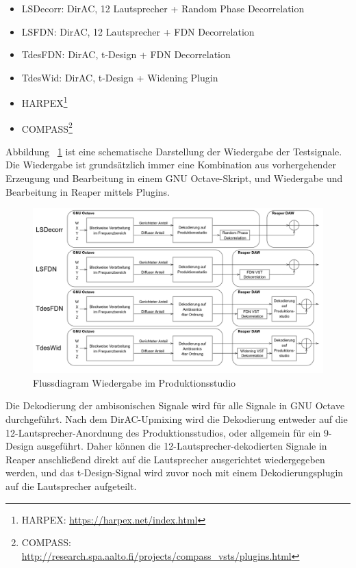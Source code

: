 \begin{itemize}
	\item LSDecorr: DirAC, 12 Lautsprecher + Random Phase Decorrelation
	\item LSFDN: DirAC, 12 Lautsprecher + FDN Decorrelation
	\item TdesFDN: DirAC, t-Design + FDN Decorrelation
	\item TdesWid: DirAC, t-Design + Widening Plugin
	\item HARPEX\footnote{HARPEX: \url{https://harpex.net/index.html}}
	\item COMPASS\footnote{COMPASS: \url{http://research.spa.aalto.fi/projects/compass_vsts/plugins.html}}
\end{itemize}




Abbildung ~\ref{fig:algos} ist eine schematische Darstellung der Wiedergabe der Testsignale. Die Wiedergabe ist grundsätzlich immer eine Kombination aus vorhergehender Erzeugung und Bearbeitung in einem GNU Octave-Skript, und Wiedergabe und Bearbeitung in Reaper mittels Plugins.

\begin{figure}[!ht]
  \centering
  \includegraphics[width=1\textwidth]{aufbau/diagram.png}
  \caption{Flussdiagram Wiedergabe im Produktionsstudio}
  	\label{fig:algos}
\end{figure}

Die Dekodierung der ambisonischen Signale wird für alle Signale in GNU Octave durchgeführt. Nach dem DirAC-Upmixing wird die Dekodierung entweder auf die 12-Lautsprecher-Anordnung des Produktionsstudios, oder allgemein für ein 9-Design ausgeführt. Daher können die 12-Lautsprecher-dekodierten Signale in Reaper anschließend direkt auf die Lautsprecher ausgerichtet wiedergegeben werden, und das t-Design-Signal wird zuvor noch mit einem Dekodierungsplugin auf die Lautsprecher aufgeteilt.

